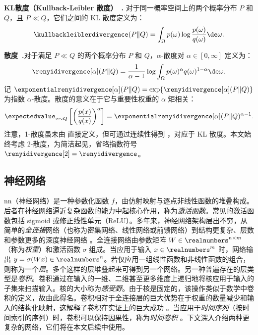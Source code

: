 \noindent\textbf{KL散度（Kullback-Leibler 散度）~\cite[Section~2.3]{cover1991information}.}\indent
对于同一概率空间上的两个概率分布 $P$ 和 $Q$，且 $P \ll Q$，它们之间的 KL 散度定义为：
\begin{align*}
    \kullbackleiblerdivergence(P\Vert Q)=\int_{\Omega} p(\omega) \log \frac{p(\omega)}{q(\omega)} \de \omega.
\end{align*}

\noindent\textbf{\Renyi 散度~\cite{renyi1961measures}.}\indent 对于满足 $P \ll Q$ 的两个概率分布 $P$ 和 $Q$，$\alpha$-\Renyi 散度对 $\alpha \in [0,\infty]$ 定义为：
\begin{align}
\label{eq:renyi_div}
	\renyidivergence[\alpha](P\Vert Q) = \frac{1}{\alpha-1}\log \int_{\Omega} p(\omega)^\alpha q(\omega)^{1-\alpha} \de \omega.
\end{align}
记 $\exponentialrenyidivergence[\alpha](P\Vert Q) = \exp\{\renyidivergence[\alpha](P\Vert Q)\}$ 为指数 $\alpha$-\Renyi 散度。\Renyi 散度的意义在于它与重要性权重的 $\alpha$ 矩相关：
\begin{align*}
    \expectedvalue_{x\sim Q}\left[\left(\frac{p(x)}{q(x)}\right)^{\alpha}\right] = \exponentialrenyidivergence[\alpha](P\Vert Q)^{\alpha-1}.
\end{align*}
注意，1-\Renyi 散度虽未由  直接定义，但可通过连续性得到 \cite{van2014renyi}，对应于 KL 散度。本文始终考虑 2-\Renyi 散度，为简洁起见，省略指数符号 $\renyidivergence[2]=\renyidivergence$。


\subsection{神经网络}
\gls{nn}（神经网络）是一种参数化函数 $f$，由仿射映射与逐点非线性函数的堆叠构成。后者在神经网络逼近复杂函数的能力中起核心作用，称为\emph{激活函数}。常见的激活函数包括 sigmoid 或修正线性单元（ReLU）。多年来，神经网络架构层出不穷，从简单的\emph{全连接}网络（也称为密集网络、线性网络或前馈网络）到结构更复杂、层数和参数更多的深度神经网络 \cite{goodfellow2016deep}。全连接网络由参数矩阵 $W\in\realnumbers^{n\times m}$（称为\emph{权重}）和激活函数 $\sigma$ 组成。当应用于输入 $x\in\realnumbers^m$ 时，网络输出 $y=\sigma(Wx)\in\realnumbers^n$。若仅应用一组线性函数和非线性函数的组合，则称为一个\emph{层}。多个这样的层堆叠起来可得到另一个网络。另一种普遍存在的层类型是\emph{卷积}。卷积通过在输入的一维、二维甚至更多维度上递归地将核应用于输入的子集来扫描输入。核的大小称为\emph{感受野}。由于核是固定的，该操作类似于数学中卷积的定义，故由此得名。卷积相对于全连接层的巨大优势在于权重的数量减少和输入的结构化映射，这解释了卷积在实证上的巨大成功 \cite{krizhevsky2017imagenet}。当应用于\emph{时间序列}（按时间索引的序列）时，卷积可以保持因果性，称为\emph{时间卷积} \cite{oord2016wavenet, liotet2020deep}。下文深入介绍两种更复杂的网络，它们将在本文后续中使用。

